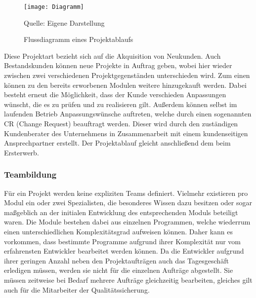\begin{figure}[H]
\begin{center}
\texttt{[image: Diagramm]}
\caption{Flussdiagramm eines Projektablaufs}
Quelle: Eigene Darstellung
\end{center}
\end{figure}
\vspace{-1cm}

Diese Projektart bezieht sich auf die Akquisition von Neukunden. Auch Bestandskunden können neue Projekte in Auftrag geben, wobei hier wieder zwischen zwei verschiedenen Projektgegenständen unterschieden wird. Zum einen können zu den bereits erworbenen Modulen weitere hinzugekauft werden. Dabei besteht erneut die Möglichkeit, dass der Kunde verschieden Anpassungen wünscht, die es zu prüfen und zu realisieren gilt. Außerdem können selbst im laufenden Betrieb Anpassungswünsche auftreten, welche durch einen sogenannten CR (Change Request) beauftragt werden. Dieser wird durch den zuständigen Kundenberater des Unternehmens in Zusammenarbeit mit einem kundenseitigen Ansprechpartner erstellt. Der Projektablauf gleicht anschließend dem beim Ersterwerb.

\subsubsection{Teambildung}
Für ein Projekt werden keine expliziten Teams definiert. Vielmehr existieren pro Modul ein oder zwei Spezialisten, die besonderes Wissen dazu besitzen oder sogar maßgeblich an der initialen Entwicklung des entsprechenden Moduls beteiligt waren. Die Module bestehen dabei aus einzelnen Programmen, welche wiederrum einen unterschiedlichen Komplexitätsgrad aufweisen können. Daher kann es vorkommen, dass bestimmte Programme aufgrund ihrer Komplexität nur vom erfahrensten Entwickler bearbeitet werden können. Da die Entwickler aufgrund ihrer geringen Anzahl neben den Projektaufträgen auch das Tagesgeschäft erledigen müssen, werden sie nicht für die einzelnen Aufträge abgestellt. Sie müssen zeitweise bei Bedarf mehrere Aufträge gleichzeitig bearbeiten, gleiches gilt auch für die Mitarbeiter der Qualitätssicherung.

